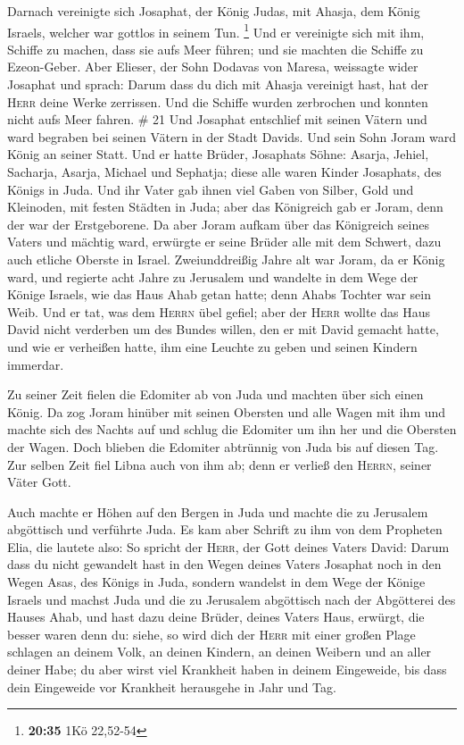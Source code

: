  Darnach vereinigte sich Josaphat, der König Judas, mit
Ahasja, dem König Israels, welcher war gottlos in seinem Tun.
\footnote{\textbf{20:35} 1Kö 22,52-54}  Und er vereinigte
sich mit ihm, Schiffe zu machen, dass sie aufs Meer führen; und sie
machten die Schiffe zu Ezeon-Geber.  Aber Elieser, der
Sohn Dodavas von Maresa, weissagte wider Josaphat und sprach: Darum dass
du dich mit Ahasja vereinigt hast, hat der \textsc{Herr} deine Werke
zerrissen. Und die Schiffe wurden zerbrochen und konnten nicht aufs Meer
fahren. \# 21  Und Josaphat entschlief mit seinen Vätern
und ward begraben bei seinen Vätern in der Stadt Davids. Und sein Sohn
Joram ward König an seiner Statt.  Und er hatte Brüder,
Josaphats Söhne: Asarja, Jehiel, Sacharja, Asarja, Michael und Sephatja;
diese alle waren Kinder Josaphats, des Königs in Juda. 
Und ihr Vater gab ihnen viel Gaben von Silber, Gold und Kleinoden, mit
festen Städten in Juda; aber das Königreich gab er Joram, denn der war
der Erstgeborene.  Da aber Joram aufkam über das
Königreich seines Vaters und mächtig ward, erwürgte er seine Brüder alle
mit dem Schwert, dazu auch etliche Oberste in Israel. 
Zweiunddreißig Jahre alt war Joram, da er König ward, und regierte acht
Jahre zu Jerusalem  und wandelte in dem Wege der Könige
Israels, wie das Haus Ahab getan hatte; denn Ahabs Tochter war sein
Weib. Und er tat, was dem \textsc{Herrn} übel gefiel; 
aber der \textsc{Herr} wollte das Haus David nicht verderben um des
Bundes willen, den er mit David gemacht hatte, und wie er verheißen
hatte, ihm eine Leuchte zu geben und seinen Kindern immerdar.

 Zu seiner Zeit fielen die Edomiter ab von Juda und
machten über sich einen König.  Da zog Joram hinüber mit
seinen Obersten und alle Wagen mit ihm und machte sich des Nachts auf
und schlug die Edomiter um ihn her und die Obersten der Wagen.
 Doch blieben die Edomiter abtrünnig von Juda bis auf
diesen Tag. Zur selben Zeit fiel Libna auch von ihm ab; denn er verließ
den \textsc{Herrn}, seiner Väter Gott.

 Auch machte er Höhen auf den Bergen in Juda und machte
die zu Jerusalem abgöttisch und verführte Juda.  Es kam
aber Schrift zu ihm von dem Propheten Elia, die lautete also: So spricht
der \textsc{Herr}, der Gott deines Vaters David: Darum dass du nicht
gewandelt hast in den Wegen deines Vaters Josaphat noch in den Wegen
Asas, des Königs in Juda,  sondern wandelst in dem Wege
der Könige Israels und machst Juda und die zu Jerusalem abgöttisch nach
der Abgötterei des Hauses Ahab, und hast dazu deine Brüder, deines
Vaters Haus, erwürgt, die besser waren denn du:  siehe,
so wird dich der \textsc{Herr} mit einer großen Plage schlagen an deinem
Volk, an deinen Kindern, an deinen Weibern und an aller deiner Habe;
 du aber wirst viel Krankheit haben in deinem Eingeweide,
bis dass dein Eingeweide vor Krankheit herausgehe in Jahr und Tag.

